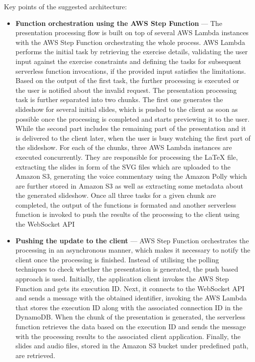 Key points of the suggested architecture:

\begin{itemize}
   \item \textbf{Function orchestration using the AWS Step Function} --- The presentation processing flow is built on top of several AWS Lambda instances with the AWS Step Function orchestrating the whole process.
   AWS Lambda performs the initial task by retrieving the exercise details, validating the user input against the exercise constraints and defining the tasks for subsequent serverless function invocations, if the provided input satisfies the limitations.
   Based on the output of the first task, the further processing is executed or the user is notified about the invalid request.
   The presentation processing task is further separated into two chunks. 
   The first one generates the slideshow for several initial slides, which is pushed to the client as soon as possible once the processing is completed and starts previewing it to the user. While the second part includes the remaining part of the presentation and it is delivered to the client later, when the user is busy watching the first part of the slideshow.
   For each of the chunks, three AWS Lambda instances are executed concurrently. They are responsible for processing the LaTeX file, extracting the slides in form of the SVG files which are uploaded to the Amazon S3, generating the voice commentary using the Amazon Polly which are further stored in Amazon S3 as well as extracting some metadata about the generated slideshow.
   Once all three tasks for a given chunk are completed, the output of the functions is formated and another serverless function is invoked to push the results of the processing to the client using the WebSocket API
   \item \textbf{Pushing the update to the client} --- AWS Step Function orchestrates the processing in an asynchronous manner, which makes it necessary to notify the client once the processing is finished.
   Instead of utilising the polling techniques to check whether the presentation is generated, the push based approach is used.
   Initially, the application client invokes the AWS Step Function and gets its execution ID.
   Next, it connects to the WebSocket API and sends a message with the obtained identifier, invoking the AWS Lambda that stores the execution ID along with the associated connection ID in the DynamoDB.
   When the chunk of the presentation is generated, the serverless function retrieves the data based on the execution ID and sends the message with the processing results to the associated client application.
   Finally, the slides and audio files, stored in the Amazon S3 bucket under predefined path, are retrieved.
\end{itemize}

